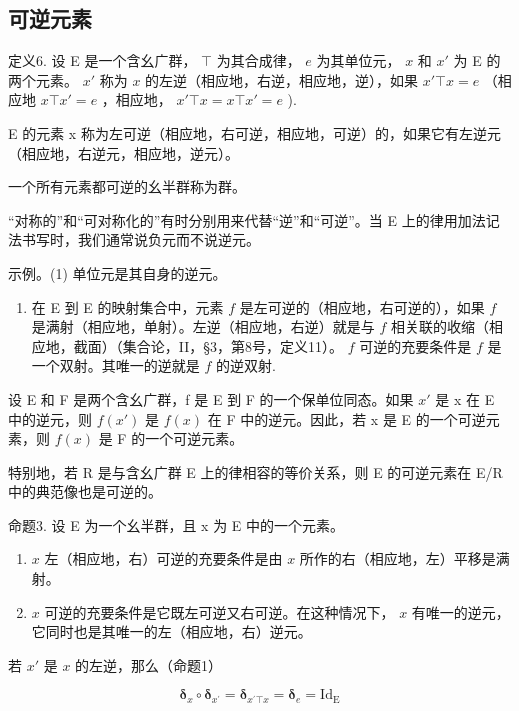 \subsection{可逆元素}

定义6. 设 E 是一个含幺广群， \(\top\) 为其合成律， \(e\) 为其单位元， \(x\) 和 \(x'\) 为 E 的两个元素。 \(x'\) 称为 \(x\) 的左逆（相应地，右逆，相应地，逆），如果 \(x' \top x = e\) （相应地 \(x \top x' = e\) ，相应地， \(x' \top x = x \top x' = e\) ).

E 的元素 x 称为左可逆（相应地，右可逆，相应地，可逆）的，如果它有左逆元（相应地，右逆元，相应地，逆元）。

一个所有元素都可逆的幺半群称为群。

“对称的”和“可对称化的”有时分别用来代替“逆”和“可逆”。当 E 上的律用加法记法书写时，我们通常说负元而不说逆元。

示例。(1) 单位元是其自身的逆元。

\begin{enumerate}
\def\labelenumi{(\arabic{enumi})}
\setcounter{enumi}{1}
\tightlist
\item
  在 E 到 E 的映射集合中，元素 \(f\) 是左可逆的（相应地，右可逆的），如果 \(f\) 是满射（相应地，单射）。左逆（相应地，右逆）就是与 \(f\) 相关联的收缩（相应地，截面）（集合论，II，§3，第8号，定义11）。 \(f\) 可逆的充要条件是 \(f\) 是一个双射。其唯一的逆就是 \(f\) 的逆双射.
\end{enumerate}

设 E 和 F 是两个含幺广群，f 是 E 到 F 的一个保单位同态。如果 \(x'\) 是 x 在 E 中的逆元，则 \(f(x')\) 是 \(f(x)\) 在 F 中的逆元。因此，若 x 是 E 的一个可逆元素，则 \(f(x)\) 是 F 的一个可逆元素。

特别地，若 R 是与含幺广群 E 上的律相容的等价关系，则 E 的可逆元素在 E/R 中的典范像也是可逆的。

命题3. 设 E 为一个幺半群，且 x 为 E 中的一个元素。

\begin{enumerate}
\def\labelenumi{(\roman{enumi})}
\item
  \(x\) 左（相应地，右）可逆的充要条件是由 \(x\) 所作的右（相应地，左）平移是满射。
\item
  \(x\) 可逆的充要条件是它既左可逆又右可逆。在这种情况下， \(x\) 有唯一的逆元，它同时也是其唯一的左（相应地，右）逆元。
\end{enumerate}

若 \(x'\) 是 \(x\) 的左逆，那么（命题1）

\[
\boldsymbol {\delta} _ {x} \circ \boldsymbol {\delta} _ {x ^ {\prime}} = \boldsymbol {\delta} _ {x ^ {\prime} \top x} = \boldsymbol {\delta} _ {e} = \mathrm{Id} _ {\mathrm{E}}
\]

